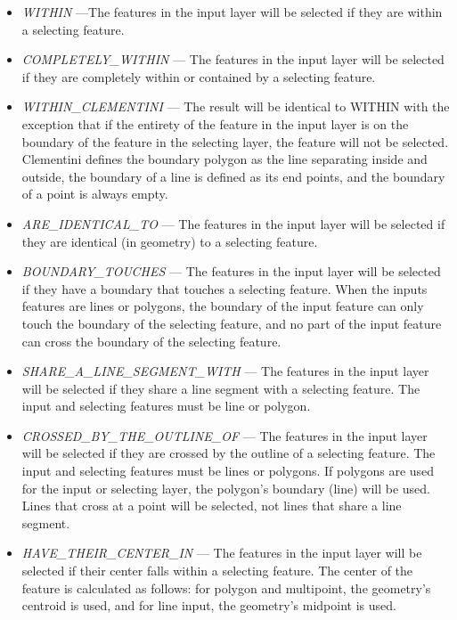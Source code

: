 \documentclass[openany]{book}
\theoremstyle{definition}
\theoremstyle{definition}
\theoremstyle{definition}
\theoremstyle{remark}
\begin{document}
\begin{enumerate}
\begin{itemize}
  \item
    \emph{WITHIN} ---The features in the input layer will be selected if
    they are within a selecting feature.\\
  \item
    \emph{COMPLETELY\_WITHIN} --- The features in the input layer will
    be selected if they are completely within or contained by a
    selecting feature.\\
  \item
    \emph{WITHIN\_CLEMENTINI} --- The result will be identical to WITHIN
    with the exception that if the entirety of the feature in the input
    layer is on the boundary of the feature in the selecting layer, the
    feature will not be selected. Clementini defines the boundary
    polygon as the line separating inside and outside, the boundary of a
    line is defined as its end points, and the boundary of a point is
    always empty.\\
  \item
    \emph{ARE\_IDENTICAL\_TO} --- The features in the input layer will
    be selected if they are identical (in geometry) to a selecting
    feature.\\
  \item
    \emph{BOUNDARY\_TOUCHES} --- The features in the input layer will be
    selected if they have a boundary that touches a selecting feature.
    When the inputs features are lines or polygons, the boundary of the
    input feature can only touch the boundary of the selecting feature,
    and no part of the input feature can cross the boundary of the
    selecting feature.\\
  \item
    \emph{SHARE\_A\_LINE\_SEGMENT\_WITH} --- The features in the input
    layer will be selected if they share a line segment with a selecting
    feature. The input and selecting features must be line or polygon.\\
  \item
    \emph{CROSSED\_BY\_THE\_OUTLINE\_OF} --- The features in the input
    layer will be selected if they are crossed by the outline of a
    selecting feature. The input and selecting features must be lines or
    polygons. If polygons are used for the input or selecting layer, the
    polygon's boundary (line) will be used. Lines that cross at a point
    will be selected, not lines that share a line segment.\\
  \item
    \emph{HAVE\_THEIR\_CENTER\_IN} --- The features in the input layer
    will be selected if their center falls within a selecting feature.
    The center of the feature is calculated as follows: for polygon and
    multipoint, the geometry's centroid is used, and for line input, the
    geometry's midpoint is used.
  \end{itemize}
\end{enumerate}
\end{document}
